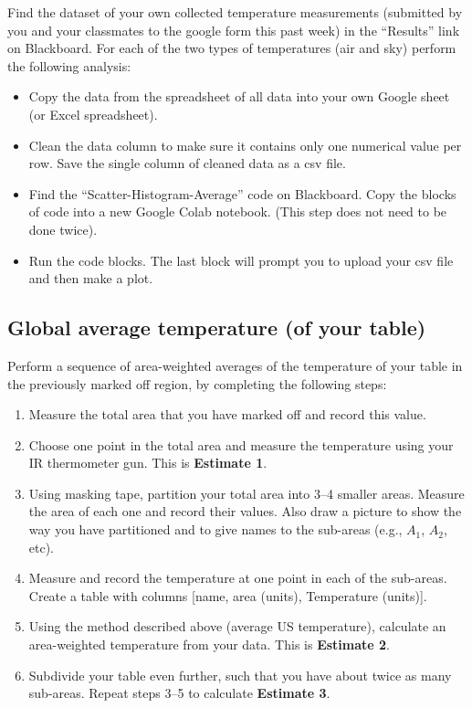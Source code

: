 Find the dataset of your own collected temperature measurements (submitted by you and your classmates to the google form this past week) in the ``Results'' link on Blackboard.  For each of the two types of temperatures (air and sky) perform the following analysis:
	\begin{itemize}
	\item Copy the data from the spreadsheet of all data into your own Google sheet (or Excel spreadsheet).  
	\item Clean the data column to make sure it contains only one numerical value per row. Save the single column of cleaned data as a csv file.
	\item Find the ``Scatter-Histogram-Average'' code on Blackboard.  Copy the blocks of code into a new Google Colab notebook. (This step does not need to be done twice).
	\item Run the code blocks. The last block will prompt you to upload your csv file and then make a plot.
	\end{itemize}


\subsection{Global average temperature (of your table)}

Perform a sequence of area-weighted averages of the temperature of your table in the previously marked off region, by completing the following steps:
	\begin{enumerate}
	\item Measure the total area that you have marked off and record this value.
	\item Choose one point in the total area and measure the temperature using your IR thermometer gun.  This is {\bf Estimate 1}.
	\item Using masking tape, partition your total area into 3--4 smaller areas.  Measure the area of each one and record their values.  Also draw a picture to show the way you have partitioned and to give names to the sub-areas (e.g., $A_1$, $A_2$, etc).  
	\item Measure and record the temperature at one point in each of the sub-areas. Create a table with columns [name, area (units),  Temperature (units)].
	\item Using the method described above (average US temperature), calculate an area-weighted temperature from your data. This is {\bf Estimate 2}.
	\item Subdivide your table even further, such that you have about twice as many sub-areas.  Repeat steps 3--5 to calculate {\bf Estimate 3}.
	\end{enumerate}


